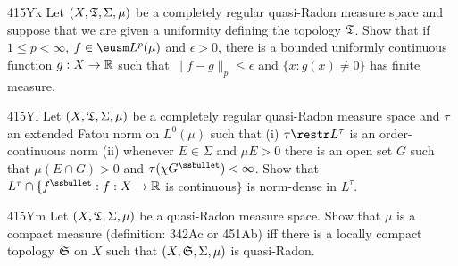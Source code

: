 {\spheader 415Yk Let $(X,\frak T,\Sigma,\mu)$ be a completely regular
quasi-Radon measure space and suppose that we are given a uniformity
defining the topology $\frak T$.
Show that if $1\le p<\infty$, $f\in\eusm L^p(\mu)$ and $\epsilon>0$,
there is a bounded uniformly continuous function $g:X\to\Bbb R$ such
that $\|f-g\|_p\le\epsilon$ and $\{x:g(x)\ne 0\}$ has finite measure.

\spheader 415Yl Let $(X,\frak T,\Sigma,\mu)$ be a completely regular
quasi-Radon measure space and $\tau$ an extended Fatou norm on
$L^0(\mu)$ such that (i) $\tau\restr L^{\tau}$ is an
order-continuous norm (ii) whenever $E\in\Sigma$ and $\mu E>0$ there is
an open set $G$ such that $\mu(E\cap G)>0$ and
$\tau(\chi G^{\ssbullet})<\infty$.   Show that
$L^{\tau}\cap\{f^{\ssbullet}:f:X\to\Bbb R$ is continuous$\}$ is
norm-dense in $L^{\tau}$.

\spheader 415Ym Let $(X,\frak T,\Sigma,\mu)$ be a quasi-Radon measure
space.   Show that $\mu$ is a compact measure (definition:  342Ac or
451Ab) iff
there is a locally compact topology $\frak S$ on $X$ such that
$(X,\frak S,\Sigma,\mu)$ is quasi-Radon.

}%

